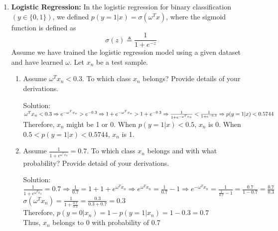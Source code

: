 \documentclass[12pt]{article}
\newcommand{\solu}{{\color{blue} Solution:}}
\begin{document}
\begin{enumerate}
        \item \textbf{Logistic Regression:} In the logistic regression for binary classification $(y \in \{0,1\})$, we defined $p(y = 1 | x) = \sigma(\omega^Tx)$, where the sigmoid function is defined as
        $$\sigma(z) \triangleq \frac{1}{1 + e^{-z}}$$
        Assume we have trained the logistic regression model using a given dataset and have learned $\omega$. Let $x_n$ be a test sample.
        \begin{enumerate}
            \item Assume $\omega^T x_n < 0.3$. To which class $x_n$ belongs? Provide details of your derivations.
            
            \solu\\
            $\omega^T x_n < 0.3 \Rightarrow e^{-\omega^T x_n} > e^{-0.3}\\
            \Rightarrow 1 + e^{-\omega^T x_n} > 1 + e^{-0.3}\\
            \Rightarrow \frac{1}{1 + e^{-\omega^T x_n}} < \frac{1}{1 + e^{-0.3}}\\
            \Rightarrow p(y = 1 | x) < 0.5744$\\
            Therefore, $x_n$ might be 1 or 0. When $p(y = 1 | x) < 0.5$, $x_n$ is 0. When $0.5 < p(y = 1 | x) < 0.5744$, $x_n$ is 1. 
            \item Assume $\frac{1}{1+e^{\omega^T x_n}} = 0.7.$ To which class $x_n$ belongs and with what probability? Provide detaisl of your derivations.
            
            \solu \\
            $\frac{1}{1+e^{\omega^T x_n}} = 0.7 \Rightarrow \frac{1}{0.7} = 1 + 1+e^{\omega^T x_n} \Rightarrow e^{\omega^T x_n} = \frac{1}{0.7} -1 \Rightarrow e^{-\omega^T x_n} = \frac{1}{\frac{1}{0.7} -1} = \frac{0.7}{1-0.7} = \frac{0.7}{0.3} $\\
            $\sigma(\omega^Tx_n) = \frac{1}{1+\frac{0.7}{0.3}} = \frac{0.3}{0.3+0.7} = 0.3$\\
            Therefore, $p(y = 0 | x_n) = 1 - p(y = 1 | x_n) = 1-0.3 = 0.7$ \\
            Thus, $x_n$ belongs to 0 with probability of 0.7
        \end{enumerate}
    \end{enumerate}
\end{document}
